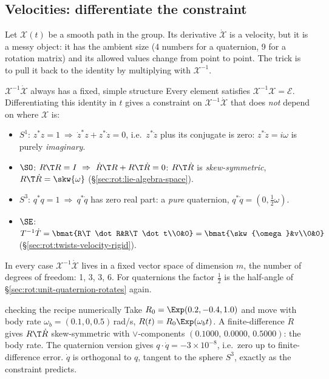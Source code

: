 \subsection{Velocities: differentiate the constraint}\label{sec:lie:velocities}

Let $\mathcal X(t)$ be a smooth path in the group. Its derivative $\dot{\mathcal X}$ is a velocity, but it is a messy object: it has the ambient size (4 numbers for a quaternion, 9 for a rotation matrix) and its allowed values change from point to point. The trick is to pull it back to the identity by multiplying with $\mathcal X^{-1}$.

\begin{deriv}{$\mathcal X^{-1}\dot{\mathcal X}$ always has a fixed, simple structure}
Every element satisfies $\mathcal X^{-1}\mathcal X=\mathcal E$. Differentiating this identity in $t$ gives a constraint on $\mathcal X^{-1}\dot{\mathcal X}$ that does \emph{not} depend on where $\mathcal X$ is:
\begin{itemize}
\item $S^1$: $z^*z=1\ \Rightarrow\ \dot z^*z+z^*\dot z=0$, i.e.\ $z^*\dot z$ plus its conjugate is zero: $z^*\dot z=i\omega$ is purely \emph{imaginary}.
\item $\SO$: $R\T R=I\ \Rightarrow\ \dot R\T R+R\T\dot R=0$: $R\T\dot R$ is \emph{skew-symmetric}, $R\T\dot R=\skw{\omega}$ (\S\ref{sec:rot:lie-algebra-space}).
\item $S^3$: $q^*q=1\ \Rightarrow\ q^*\dot q$ has zero real part: a \emph{pure} quaternion, $q^*\dot q=(0,\tfrac12\omega)$.
\item $\SE$: $T^{-1}\dot T=\bmat{R\T\dot R&R\T\dot t\\0&0}=\bmat{\skw{\omega}&v\\0&0}$ (\S\ref{sec:rot:twists-velocity-rigid}).
\end{itemize}
In every case $\mathcal X^{-1}\dot{\mathcal X}$ lives in a fixed vector space of dimension $m$, the number of degrees of freedom: 1, 3, 3, 6. For quaternions the factor $\frac12$ is the half-angle of \S\ref{sec:rot:unit-quaternion-rotates} again.
\end{deriv}

\begin{example}{checking the recipe numerically}
Take $R_0=\Exp(0.2,-0.4,1.0)$ and move with body rate $\omega_b=(0.1,0,0.5)$\,rad/s, $R(t)=R_0\Exp(\omega_bt)$. A finite-difference $\dot R$ gives $R\T\dot R$ skew-symmetric with $\vee$-components $(0.1000,\,0.0000,\,0.5000)$: the body rate. The quaternion version gives $q\cdot\dot q=-3\times10^{-8}$, i.e.\ zero up to finite-difference error. $\dot q$ is orthogonal to $q$, tangent to the sphere $S^3$, exactly as the constraint predicts.
\end{example}
